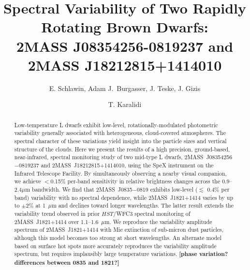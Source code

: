 \documentclass[twocolumn]{aastex6}
\begin{document}
\title{Spectral Variability of Two Rapidly Rotating Brown Dwarfs: \\2MASS J08354256-0819237 and 2MASS J18212815+1414010}


\author{E. Schlawin, Adam J.\ Burgasser, J. Teske, J. Gizis \and T. Karalidi}



\begin{abstract}
Low-temperature L dwarfs exhibit low-level, rotationally-modulated photometric variability generally associated with heterogeneous, cloud-covered atmospheres. The spectral character of these variations yield insight into the particle sizes and vertical structure of the clouds. Here we present the results of a high precision, ground-based, near-infrared, spectral monitoring study of two mid-type L dwarfs, 2MASS~J08354256$-$0819237 and 2MASS~J18212815+1414010, using the SpeX instrument on the Infrared Telescope Facility. By simultaneously observing a nearby visual companion, we achieve $<$0.15\% per-band sensitivity in relative brightness changes across the 0.9--2.4$\mu$m bandwidth. We find that 2MASS~J0835$-$0819 exhibits low-level ($\lesssim$ 0.4\% per band) variability with no spectral dependence, while 2MASS~J1821+1414 varies by up to $\pm$2\% at 1~$\mu$m and declines toward longer wavelengths. The latter result extends the variability trend observed in prior $HST$/WFC3 spectral monitoring of 2MASS~J1821+1414 over 1.1--1.6~$\mu$m. We reproduce the variability amplitude spectrum of 2MASS~J1821+1414 with Mie extinction of sub-micron dust particles, although this model becomes too strong at short wavelengths. An alternate model based on surface hot spots more accurately reproduces the variability amplitude spectrum, but requires implausibly large temperature variations. {\bf [phase variation? differences between 0835 and 1821?]}
\end{abstract}
\end{document}
